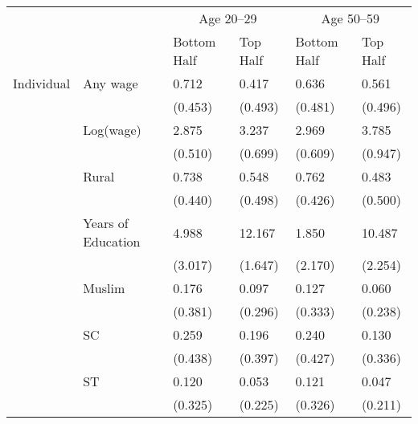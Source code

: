 \begin{tabular}{llllll}
\hline
           &                             & \multicolumn{2}{c}{Age 20--29}       & \multicolumn{2}{c}{Age 50--59}                                                                                     \\
           &                             & Bottom Half                          & Top Half                             & Bottom Half                          & Top Half                             \\ \hline
Individual & Any wage                    & 0.712          & 0.417          & 0.636          & 0.561          \\
           &                             & (0.453)     & (0.493)     & (0.481)     & (0.496)     \\
           & Log(wage)                   & 2.875           & 3.237           & 2.969           & 3.785           \\
           &                             & (0.510)      & (0.699)      & (0.609)      & (0.947)      \\
           & Rural                       & 0.738             & 0.548             & 0.762             & 0.483             \\
           &                             & (0.440)        & (0.498)        & (0.426)        & (0.500)        \\
           & Years of Education          & 4.988          & 12.167          & 1.850          & 10.487          \\
           &                             & (3.017)     & (1.647)     & (2.170)     & (2.254)     \\
           & Muslim                      & 0.176            & 0.097            & 0.127            & 0.060            \\
           &                             & (0.381)       & (0.296)       & (0.333)       & (0.238)       \\
           & SC                          & 0.259                & 0.196                & 0.240                & 0.130                \\
           &                             & (0.438)           & (0.397)           & (0.427)           & (0.336)           \\
           & ST                          & 0.120                & 0.053                & 0.121                & 0.047                \\
           &                             & (0.325)           & (0.225)           & (0.326)           & (0.211)           \\

\end{tabular}
